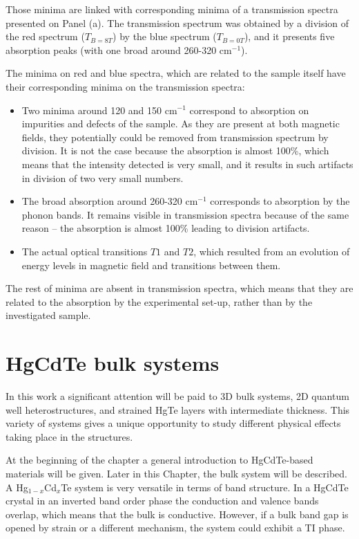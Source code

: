 \documentclass[titlepage,a4paper]{book}
\newcommand{\wciecie}{\quad\phantom{v}}
\begin{document}
Those minima are linked with corresponding minima of a transmission spectra presented on Panel (a). The transmission spectrum was obtained by a division of the red spectrum ($T_{B=8T}$) by the blue spectrum ($T_{B=0T}$), and it presents five absorption peaks (with one broad around 260-320 cm$^{-1}$). 

The minima on red and blue spectra, which are related to the sample itself have their corresponding minima on the transmission spectra:
\begin{itemize}
\item Two minima around 120 and 150 cm$^{-1}$ correspond to absorption on impurities and defects of the sample. As they are present at both magnetic fields, they potentially could be removed from transmission spectrum by division. It is not the case because the absorption is almost 100\%, which means that the intensity detected is very small, and it results in such artifacts in division of two very small numbers.
\item The broad absorption around 260-320 cm$^{-1}$ corresponds to absorption by the phonon bands. It remains visible in transmission spectra because of the same reason -- the absorption is almost 100\% leading to division artifacts.
\item The actual optical transitions $T1$ and $T2$, which resulted from an evolution of energy levels in magnetic field and transitions between them.
\end{itemize}

The rest of minima are absent in transmission spectra, which means that they are related to the absorption by the experimental set-up, rather than by the investigated sample.


\chapter{HgCdTe bulk systems}
\label{chpt:HgCdTe bulk systems}
\wciecie
In this work a significant attention will be paid to 3D bulk systems, 2D quantum well heterostructures, and strained HgTe layers with intermediate thickness. This variety of systems gives a unique opportunity to study different physical effects taking place in the structures. 

At the beginning of the chapter a general introduction to HgCdTe-based materials will be given. Later in this Chapter, the bulk system will be described. A Hg$_{1-x}$Cd$_x$Te system is very versatile in terms of band structure. In a HgCdTe crystal in an inverted band order phase the conduction and valence bands overlap, which means that the bulk is conductive. However, if a bulk band gap is opened by strain or a different mechanism, the system could exhibit a TI phase. 
\end{document}
